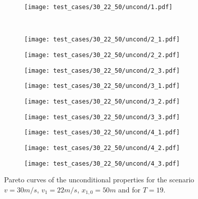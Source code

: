 \begin{figure}[H]
\vspace{3em}
\centering
\begin{subfigure}{0.32\textwidth}
  \centering
  \texttt{[image: test\_cases/30\_22\_50/uncond/1.pdf]}
\end{subfigure}\\
\begin{subfigure}{0.32\textwidth}
  \centering
  \texttt{[image: test\_cases/30\_22\_50/uncond/2\_1.pdf]}
\end{subfigure} 
\begin{subfigure}{0.32\textwidth}
  \centering
  \texttt{[image: test\_cases/30\_22\_50/uncond/2\_2.pdf]}
\end{subfigure}
\begin{subfigure}{0.32\textwidth}
  \centering
  \texttt{[image: test\_cases/30\_22\_50/uncond/2\_3.pdf]}
\end{subfigure}
\begin{subfigure}{0.32\textwidth}
  \centering
  \texttt{[image: test\_cases/30\_22\_50/uncond/3\_1.pdf]}
\end{subfigure}
\begin{subfigure}{0.32\textwidth}
  \centering
  \texttt{[image: test\_cases/30\_22\_50/uncond/3\_2.pdf]}
\end{subfigure}
\begin{subfigure}{0.32\textwidth}
  \centering
  \texttt{[image: test\_cases/30\_22\_50/uncond/3\_3.pdf]}
\end{subfigure}
\begin{subfigure}{0.32\textwidth}
  \centering
  \texttt{[image: test\_cases/30\_22\_50/uncond/4\_1.pdf]}
\end{subfigure} 
\begin{subfigure}{0.32\textwidth}
  \centering
  \texttt{[image: test\_cases/30\_22\_50/uncond/4\_2.pdf]}
\end{subfigure}
\begin{subfigure}{0.32\textwidth}
  \centering
  \texttt{[image: test\_cases/30\_22\_50/uncond/4\_3.pdf]}
\end{subfigure}
\caption{Pareto curves of the unconditional properties for the scenario $v = 30m/s$, $v_1 = 22m/s$, $x_{1,0} = 50m$ and for $T = 19$.}
\label{fig:test_case_2_uncond}
\end{figure}

